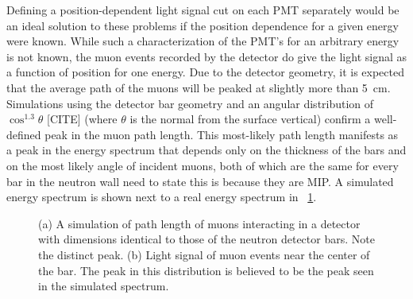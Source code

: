 Defining a position-dependent light signal cut on each PMT separately would be an ideal solution to these problems if the position dependence for a given energy were known.  While such a characterization of the PMT's for an arbitrary energy is not known, the muon events recorded by the detector do give the light signal as a function of position for one energy.  Due to the detector geometry, it is expected that the average path of the muons will be peaked at slightly more than 5~cm.  Simulations using the detector bar geometry and an angular distribution of $\cos^{1.3}{\theta}$ [CITE] (where $\theta$ is the normal from the surface vertical) confirm a well-defined peak in the muon path length. This most-likely path length manifests as a peak in the energy spectrum that depends only on the thickness of the bars and on the most likely angle of incident muons, both of which are the same for every bar in the neutron wall {need to state this is because they are MIP}.  A simulated energy spectrum is shown next to a real energy spectrum in {\fig}~\ref{fig:muonSpectrum}. 
\begin{figure}[!htbp]
\centering
{}
\caption{(a) A simulation of path length of muons interacting in a detector with dimensions identical to those of the neutron detector bars.  Note the distinct peak. (b) Light signal of muon events near the center of the bar.  The peak in this distribution is believed to be the peak seen in the simulated spectrum.}
\label{fig:muonSpectrum}
\end{figure}
